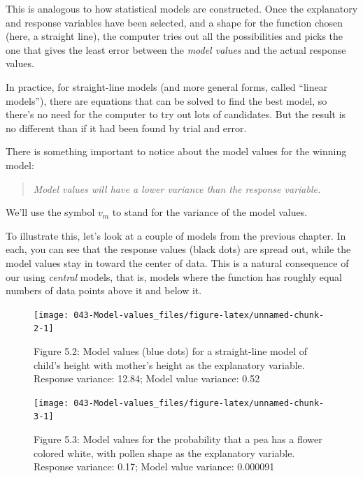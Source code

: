 \documentclass[]{tufte-book}
\begin{document}
This is analogous to how statistical models are constructed. Once the explanatory and response variables have been selected, and a shape for the function chosen (here, a straight line), the computer tries out all the possibilities and picks the one that gives the least error between the \emph{model values} and the actual response values.

In practice, for straight-line models (and more general forms, called ``linear models''), there are equations that can be solved to find the best model, so there's no need for the computer to try out lots of candidates. But the result is no different than if it had been found by trial and error.

There is something important to notice about the model values for the winning model:

\begin{quote}
\emph{Model values will have a lower variance than the response variable.}
\end{quote}

We'll use the symbol \(v_m\) to stand for the variance of the model values.

To illustrate this, let's look at a couple of models from the previous chapter. In each, you can see that the response values (black dots) are spread out, while the model values stay in toward the center of data. This is a natural consequence of our using \emph{central} models, that is, models where the function has roughly equal numbers of data points above it and below it.

\begin{figure}\texttt{[image: 043-Model-values\_files/figure-latex/unnamed-chunk-2-1]} \caption[Figure 5.2: Model values (blue dots) for a straight-line model of child's height with mother's height as the explanatory variable. Response variance: 12.84; Model value variance: 0.52]{Figure 5.2: Model values (blue dots) for a straight-line model of child's height with mother's height as the explanatory variable. Response variance: 12.84; Model value variance: 0.52}\label{fig:unnamed-chunk-2}
\end{figure}



\begin{figure}\texttt{[image: 043-Model-values\_files/figure-latex/unnamed-chunk-3-1]} \caption[Figure 5.3: Model values for the probability that a pea has a flower colored white, with pollen shape as the explanatory variable. Response variance: 0.17; Model value variance: 0.000091]{Figure 5.3: Model values for the probability that a pea has a flower colored white, with pollen shape as the explanatory variable. Response variance: 0.17; Model value variance: 0.000091}\label{fig:unnamed-chunk-3}
\end{figure}
\end{document}

